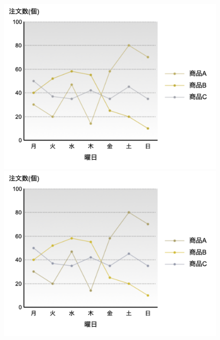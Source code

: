 \begin{figure}[H]
\begin{minipage}[b]{.23\textwidth}
        \includegraphics[keepaspectratio,width=\textwidth]{../../10_UniversalDesign/no2_line_CC_P.png}
    \end{minipage}
    \begin{minipage}[b]{.23\textwidth}
        \centering
        \includegraphics[keepaspectratio,width=\textwidth]{../../10_UniversalDesign/no2_line_CC_D.png}
    \end{minipage}
    \begin{minipage}[b]{.23\textwidth}
        \centering

\end{minipage}
\end{figure}
